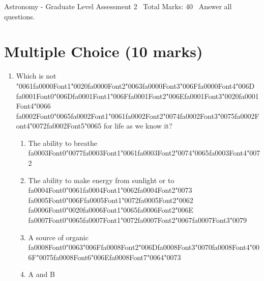 \documentclass[12pt]{article}
\begin{document}
\begin{center}
Astronomy - Graduate Level Assessment 2 \
Total Marks: 40 \
Answer all questions.
\end{center}

\section*{Multiple Choice (10 marks)}
\begin{enumerate}[label=\arabic*.]
\item Which is not {\char"0061}{\csname fa0000Font1\endcsname\char"0020}{\csname fa0000Font2\endcsname\char"0063}{\csname fa0000Font3\endcsname\char"006F}{\csname fa0000Font4\endcsname\char"006D} {\csname fa0001Font0\endcsname\char"006D}{\csname fa0001Font1\endcsname\char"006F}{\csname fa0001Font2\endcsname\char"006E}{\csname fa0001Font3\endcsname\char"0020}{\csname fa0001Font4\endcsname\char"0066} {\csname fa0002Font0\endcsname\char"0065}{\csname fa0002Font1\endcsname\char"0061}{\csname fa0002Font2\endcsname\char"0074}{\csname fa0002Font3\endcsname\char"0075}{\csname fa0002Font4\endcsname\char"0072}{\csname fa0002Font5\endcsname\char"0065} for life as we know it?
\begin{enumerate}[label=(\alph*)]
    \item The ability to breathe {\csname fa0003Font0\endcsname\char"0077}{\csname fa0003Font1\endcsname\char"0061}{\csname fa0003Font2\endcsname\char"0074}{\char"0065}{\csname fa0003Font4\endcsname\char"0072}
    \item The ability to make energy from sunlight or to {\csname fa0004Font0\endcsname\char"0061}{\csname fa0004Font1\endcsname\char"0062}{\csname fa0004Font2\endcsname\char"0073} {\csname fa0005Font0\endcsname\char"006F}{\csname fa0005Font1\endcsname\char"0072}{\csname fa0005Font2\endcsname\char"0062} {\csname fa0006Font0\endcsname\char"0020}{\csname fa0006Font1\endcsname\char"0065}{\csname fa0006Font2\endcsname\char"006E} {\csname fa0007Font0\endcsname\char"0065}{\csname fa0007Font1\endcsname\char"0072}{\csname fa0007Font2\endcsname\char"0067}{\csname fa0007Font3\endcsname\char"0079}
    \item A source of organic {\csname fa0008Font0\endcsname\char"0063}{\char"006F}{\csname fa0008Font2\endcsname\char"006D}{\csname fa0008Font3\endcsname\char"0070}{\csname fa0008Font4\endcsname\char"006F}{\char"0075}{\csname fa0008Font6\endcsname\char"006E}{\csname fa0008Font7\endcsname\char"0064}{\char"0073}
    \item A and B
\end{enumerate}

\end{enumerate}
\end{document}

